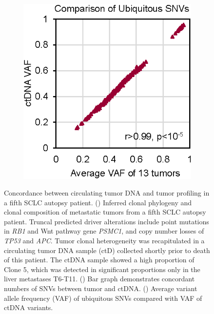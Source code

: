 \begin{figure}[htbp]
\begin{subfigure}{0.35\textwidth}
        \vspace{0.08cm}
        \includegraphics[width=\linewidth,keepaspectratio]{images/sclc/tissue_ctdna_ubiq}
        \vspace{0cm}
        \caption{}\label{fig:sclc:tissue_ctdna_ubiq}
    \end{subfigure}%
    \hspace{0.1\textwidth}
    
    \caption[Concordance between ctDNA and solid tumor in patient SCLC5.]{Concordance between circulating tumor DNA and tumor profiling in a fifth SCLC autopsy patient. () Inferred clonal phylogeny and clonal composition of metastatic tumors from a fifth SCLC autopsy patient. Truncal predicted driver alterations include point mutations in \textit{RB1} and Wnt pathway gene \textit{PSMC1}, and copy number losses of \textit{TP53} and \textit{APC}. Tumor clonal heterogeneity was recapitulated in a circulating tumor DNA sample (ctD) collected shortly prior to death of this patient. The ctDNA sample showed a high proportion of Clone 5, which was detected in significant proportions only in the liver metastases T6-T11. () Bar graph demonstrates concordant numbers of SNVs between tumor and ctDNA\@. () Average variant allele frequency (VAF) of ubiquitous SNVs compared with VAF of ctDNA variants.}
    \label{fig:sclc:patient_5}
\end{figure}
